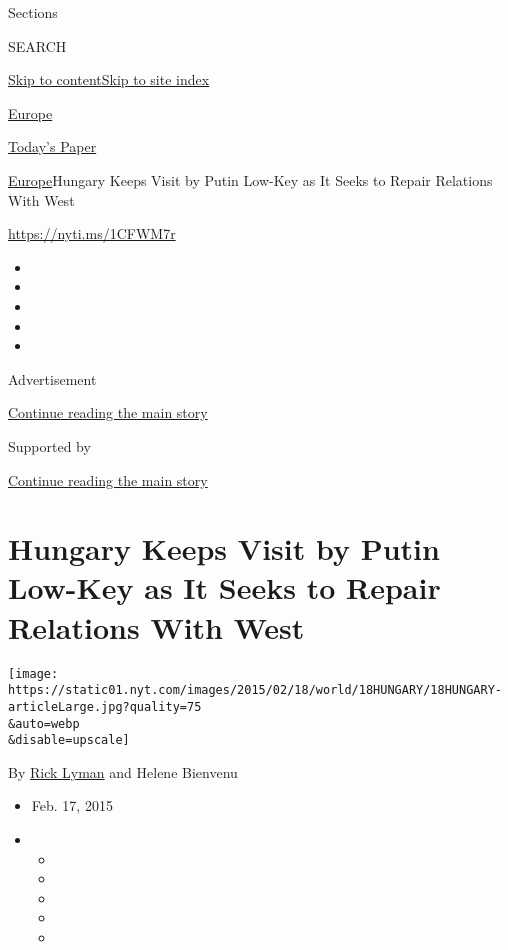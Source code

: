 Sections

SEARCH

\protect\hyperlink{site-content}{Skip to
content}\protect\hyperlink{site-index}{Skip to site index}

\href{https://www.nytimes.com/section/world/europe}{Europe}

\href{https://myaccount.nytimes.com/auth/login?response_type=cookie\&client_id=vi}{}

\href{https://www.nytimes.com/section/todayspaper}{Today's Paper}

\href{/section/world/europe}{Europe}\textbar{}Hungary Keeps Visit by
Putin Low-Key as It Seeks to Repair Relations With West

\url{https://nyti.ms/1CFWM7r}

\begin{itemize}
\item
\item
\item
\item
\item
\end{itemize}

Advertisement

\protect\hyperlink{after-top}{Continue reading the main story}

Supported by

\protect\hyperlink{after-sponsor}{Continue reading the main story}

\hypertarget{hungary-keeps-visit-by-putin-low-key-as-it-seeks-to-repair-relations-with-west}{%
\section{Hungary Keeps Visit by Putin Low-Key as It Seeks to Repair
Relations With
West}\label{hungary-keeps-visit-by-putin-low-key-as-it-seeks-to-repair-relations-with-west}}

\texttt{[image: https://static01.nyt.com/images/2015/02/18/world/18HUNGARY/18HUNGARY-articleLarge.jpg?quality=75\\\&auto=webp\\\&disable=upscale]}

By \href{https://www.nytimes.com/by/rick-lyman}{Rick Lyman} and Helene
Bienvenu

\begin{itemize}
\item
  Feb. 17, 2015
\item
  \begin{itemize}
  \item
  \item
  \item
  \item
  \item
  \end{itemize}
\end{itemize}

